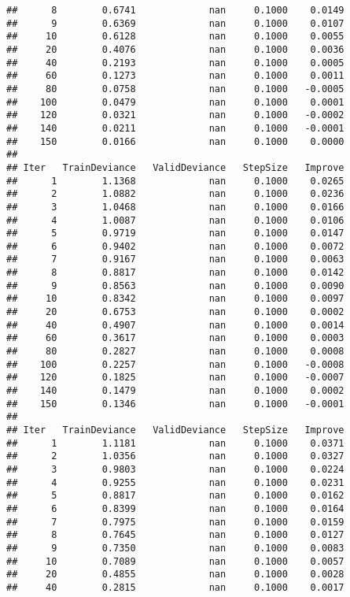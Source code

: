 \documentclass[]{article}
\begin{document}
\begin{verbatim}
##      8        0.6741             nan     0.1000    0.0149
##      9        0.6369             nan     0.1000    0.0107
##     10        0.6128             nan     0.1000    0.0055
##     20        0.4076             nan     0.1000    0.0036
##     40        0.2193             nan     0.1000    0.0005
##     60        0.1273             nan     0.1000    0.0011
##     80        0.0758             nan     0.1000   -0.0005
##    100        0.0479             nan     0.1000    0.0001
##    120        0.0321             nan     0.1000   -0.0002
##    140        0.0211             nan     0.1000   -0.0001
##    150        0.0166             nan     0.1000    0.0000
## 
## Iter   TrainDeviance   ValidDeviance   StepSize   Improve
##      1        1.1368             nan     0.1000    0.0265
##      2        1.0882             nan     0.1000    0.0236
##      3        1.0468             nan     0.1000    0.0166
##      4        1.0087             nan     0.1000    0.0106
##      5        0.9719             nan     0.1000    0.0147
##      6        0.9402             nan     0.1000    0.0072
##      7        0.9167             nan     0.1000    0.0063
##      8        0.8817             nan     0.1000    0.0142
##      9        0.8563             nan     0.1000    0.0090
##     10        0.8342             nan     0.1000    0.0097
##     20        0.6753             nan     0.1000    0.0002
##     40        0.4907             nan     0.1000    0.0014
##     60        0.3617             nan     0.1000    0.0003
##     80        0.2827             nan     0.1000    0.0008
##    100        0.2257             nan     0.1000   -0.0008
##    120        0.1825             nan     0.1000   -0.0007
##    140        0.1479             nan     0.1000    0.0002
##    150        0.1346             nan     0.1000   -0.0001
## 
## Iter   TrainDeviance   ValidDeviance   StepSize   Improve
##      1        1.1181             nan     0.1000    0.0371
##      2        1.0356             nan     0.1000    0.0327
##      3        0.9803             nan     0.1000    0.0224
##      4        0.9255             nan     0.1000    0.0231
##      5        0.8817             nan     0.1000    0.0162
##      6        0.8399             nan     0.1000    0.0164
##      7        0.7975             nan     0.1000    0.0159
##      8        0.7645             nan     0.1000    0.0127
##      9        0.7350             nan     0.1000    0.0083
##     10        0.7089             nan     0.1000    0.0057
##     20        0.4855             nan     0.1000    0.0028
##     40        0.2815             nan     0.1000    0.0017

\end{verbatim}
\end{document}
